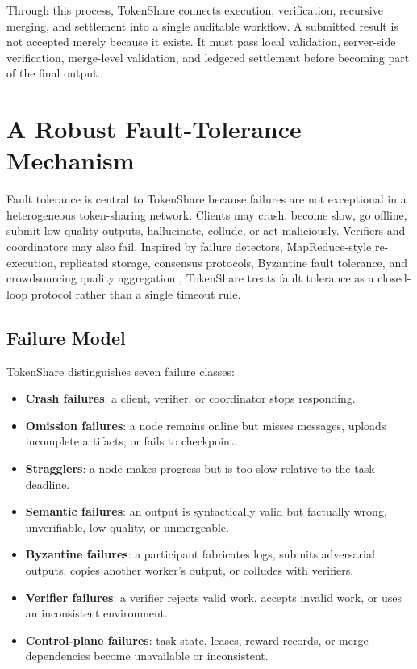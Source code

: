 \documentclass{article}
\theoremstyle{plain}
\begin{document}
Through this process, TokenShare connects execution, verification, recursive merging, and settlement into a single auditable workflow. A submitted result is not accepted merely because it exists. It must pass local validation, server-side verification, merge-level validation, and ledgered settlement before becoming part of the final output.




\section{A Robust Fault-Tolerance Mechanism}

Fault tolerance is central to TokenShare because failures are not exceptional in a heterogeneous token-sharing network. Clients may crash, become slow, go offline, submit low-quality outputs, hallucinate, collude, or act maliciously. Verifiers and coordinators may also fail. Inspired by failure detectors, MapReduce-style re-execution, replicated storage, consensus protocols, Byzantine fault tolerance, and crowdsourcing quality aggregation , TokenShare treats fault tolerance as a closed-loop protocol rather than a single timeout rule.

\subsection{Failure Model}

TokenShare distinguishes seven failure classes:
\begin{itemize}
\item \textbf{Crash failures}: a client, verifier, or coordinator stops responding.
\item \textbf{Omission failures}: a node remains online but misses messages, uploads incomplete artifacts, or fails to checkpoint.
\item \textbf{Stragglers}: a node makes progress but is too slow relative to the task deadline.
\item \textbf{Semantic failures}: an output is syntactically valid but factually wrong, unverifiable, low quality, or unmergeable.
\item \textbf{Byzantine failures}: a participant fabricates logs, submits adversarial outputs, copies another worker's output, or colludes with verifiers.
\item \textbf{Verifier failures}: a verifier rejects valid work, accepts invalid work, or uses an inconsistent environment.
\item \textbf{Control-plane failures}: task state, leases, reward records, or merge dependencies become unavailable or inconsistent.
\end{itemize}
\end{document}

